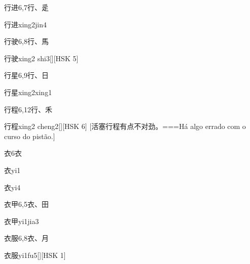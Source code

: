 \begin{Entry}{行进}{6,7}{⾏、⾡}
  \begin{Phonetics}{行进}{xing2jin4}
  \end{Phonetics}
\end{Entry}

\begin{Entry}{行驶}{6,8}{⾏、⾺}
  \begin{Phonetics}{行驶}{xing2 shi3}[][HSK 5]
  \end{Phonetics}
\end{Entry}

\begin{Entry}{行星}{6,9}{⾏、⽇}
  \begin{Phonetics}{行星}{xing2xing1}
  \end{Phonetics}
\end{Entry}

\begin{Entry}{行程}{6,12}{⾏、⽲}
  \begin{Phonetics}{行程}{xing2 cheng2}[][HSK 6]
    [活塞行程有点不对劲。===Há algo errado com o curso do pistão.]
  \end{Phonetics}
\end{Entry}

\begin{Entry}{衣}{6}{⾐}
  \begin{Phonetics}{衣}{yi1}
  \end{Phonetics}
  \begin{Phonetics}{衣}{yi4}
  \end{Phonetics}
\end{Entry}

\begin{Entry}{衣甲}{6,5}{⾐、⽥}
  \begin{Phonetics}{衣甲}{yi1jia3}
  \end{Phonetics}
\end{Entry}

\begin{Entry}{衣服}{6,8}{⾐、⽉}
  \begin{Phonetics}{衣服}{yi1fu5}[][HSK 1]
  \end{Phonetics}
\end{Entry}

